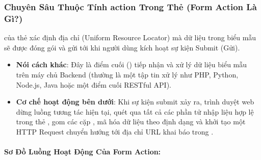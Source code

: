 \subsubsection{Chuyên Sâu Thuộc Tính action Trong Thẻ  (Form Action Là Gì?)}
\label{subsubsec:form_action}

\begin{conceptBox}
 của thẻ  xác định địa chỉ  (Uniform Resource Locator) mà dữ liệu trong biểu mẫu sẽ được đóng gói và gửi tới khi người dùng kích hoạt sự kiện Submit (Gửi).
\begin{itemize}[leftmargin=1.5em, itemsep=2pt, parsep=0pt]
    \item \textbf{Nói cách khác}: Đây là điểm cuối () tiếp nhận và xử lý dữ liệu biểu mẫu trên máy chủ Backend (thường là một tập tin xử lý như PHP, Python, Node.js, Java hoặc một điểm cuối RESTful API).
    \item \textbf{Cơ chế hoạt động bên dưới}: Khi sự kiện submit xảy ra, trình duyệt web dừng luồng tương tác hiện tại, quét qua tất cả các phần tử nhập liệu hợp lệ trong thẻ , gom các cặp , mã hóa dữ liệu theo định dạng  và khởi tạo một HTTP Request chuyển hướng tới địa chỉ URL khai báo trong .
\end{itemize}
\end{conceptBox}

\paragraph{Sơ Đồ Luồng Hoạt Động Của Form Action:}

